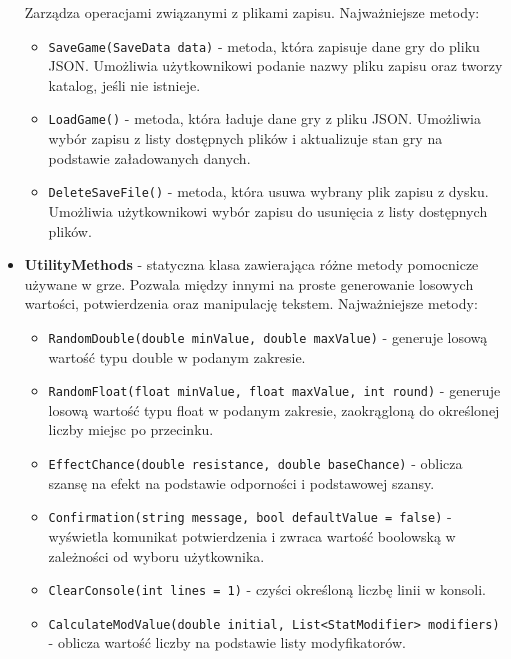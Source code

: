 \begin{itemize}
                Zarządza operacjami związanymi z plikami zapisu. Najważniejsze metody:
                    \begin{itemize}
                        \item \texttt{SaveGame(SaveData data)} - metoda, która zapisuje dane gry do pliku JSON. 
                        Umożliwia użytkownikowi podanie nazwy pliku zapisu oraz tworzy katalog, jeśli nie istnieje.
                        \item \texttt{LoadGame()} - metoda, która ładuje dane gry z pliku JSON. 
                        Umożliwia wybór zapisu z listy dostępnych plików i aktualizuje stan gry na podstawie załadowanych danych.
                        \item \texttt{DeleteSaveFile()} - metoda, która usuwa wybrany plik zapisu z dysku. 
                        Umożliwia użytkownikowi wybór zapisu do usunięcia z listy dostępnych plików.
                    \end{itemize}
                \item \textbf{UtilityMethods} - statyczna klasa zawierająca różne metody pomocnicze używane w grze. 
                Pozwala między innymi na proste generowanie losowych wartości, potwierdzenia oraz manipulację tekstem. Najważniejsze metody:
                    \begin{itemize}
                        \item \texttt{RandomDouble(double minValue, double maxValue)} - generuje losową wartość typu double w podanym zakresie.
                        \item \texttt{RandomFloat(float minValue, float maxValue, int round)} - generuje losową wartość typu float w podanym zakresie, zaokrągloną do określonej liczby miejsc po przecinku.
                        \item \texttt{EffectChance(double resistance, double baseChance)} - oblicza szansę na efekt na podstawie odporności i podstawowej szansy.
                        \item \texttt{Confirmation(string message, bool defaultValue = false)} - wyświetla komunikat potwierdzenia i zwraca wartość boolowską w zależności od wyboru użytkownika.
                        \item \texttt{ClearConsole(int lines = 1)} - czyści określoną liczbę linii w konsoli.
                        \item \texttt{CalculateModValue(double initial, List<StatModifier> modifiers)} - oblicza wartość liczby na podstawie listy modyfikatorów.

\end{itemize}
\end{itemize}
